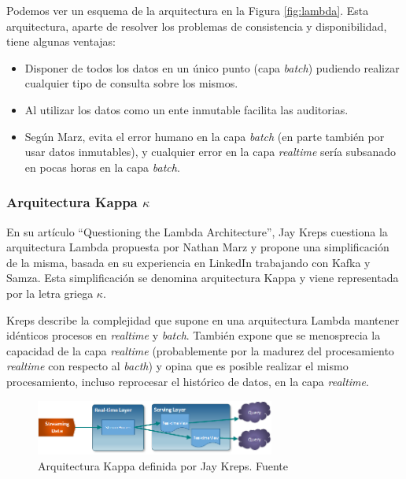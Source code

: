 Podemos ver un esquema de la arquitectura en la Figura \ref{fig:lambda}. Esta arquitectura, aparte de resolver los problemas de consistencia y disponibilidad, tiene algunas ventajas:

\begin{itemize}
	
	\item Disponer de todos los datos en un único punto (capa \textit{batch}) pudiendo realizar cualquier tipo de consulta sobre los mismos. 
	\item Al utilizar los datos como un ente inmutable facilita las auditorias. 
	\item Según Marz, evita el error humano en la capa \textit{batch} (en parte también por usar datos inmutables), y cualquier error en la capa \textit{realtime} sería subsanado en pocas horas en la capa \textit{batch}.

\end{itemize}


\subsubsection{Arquitectura Kappa $\kappa$} 
\label{section:arte:big:arq} 
En su artículo ``Questioning the Lambda Architecture''\cite{kappa}, Jay Kreps cuestiona la arquitectura Lambda propuesta por Nathan Marz y propone una simplificación de la misma, basada en su experiencia en LinkedIn trabajando con Kafka y Samza. Esta simplificación se denomina arquitectura Kappa y viene representada por la letra griega $\kappa$.


Kreps describe la complejidad que supone en una arquitectura Lambda mantener idénticos procesos en \textit{realtime} y \textit{batch}. También expone que se menosprecia la capacidad de la capa \textit{realtime} (probablemente por la madurez del procesamiento \textit{realtime} con respecto al \textit{bacth}) y opina que es posible realizar el mismo procesamiento, incluso reprocesar el histórico de datos, en la capa \textit{realtime}. 

\begin{figure}[!ht]
	\centering
	\includegraphics[width=0.70\textwidth]{images/arte/kappa}
	\caption{Arquitectura Kappa definida por Jay Kreps. Fuente \cite{lambdakappa}}
	\label{fig:kappa}
\end{figure}

